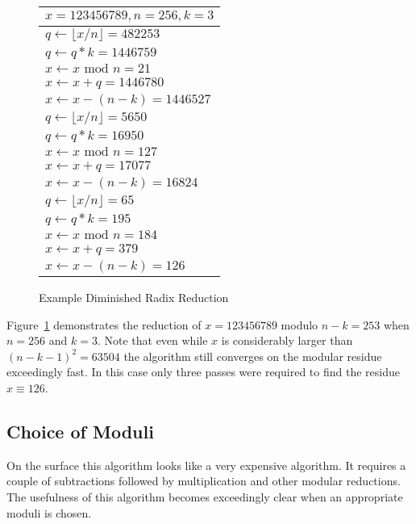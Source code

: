 \documentclass[b5paper]{book}
\begin{document}
\begin{figure}
\begin{small}
\begin{center}
\begin{tabular}{|l|}
\hline
$x = 123456789, n = 256, k = 3$ \\
\hline $q \leftarrow \lfloor x/n \rfloor = 482253$ \\
$q \leftarrow q*k = 1446759$ \\
$x \leftarrow x \mbox{ mod } n = 21$ \\
$x \leftarrow x + q = 1446780$ \\
$x \leftarrow x - (n - k) = 1446527$ \\
\hline 
$q \leftarrow \lfloor x/n \rfloor = 5650$ \\
$q \leftarrow q*k = 16950$ \\
$x \leftarrow x \mbox{ mod } n = 127$ \\
$x \leftarrow x + q = 17077$ \\
$x \leftarrow x - (n - k) = 16824$ \\
\hline 
$q \leftarrow \lfloor x/n \rfloor = 65$ \\
$q \leftarrow q*k = 195$ \\
$x \leftarrow x \mbox{ mod } n = 184$ \\
$x \leftarrow x + q = 379$ \\
$x \leftarrow x - (n - k) = 126$ \\
\hline
\end{tabular}
\end{center}
\end{small}
\caption{Example Diminished Radix Reduction}
\label{fig:EXDR}
\end{figure}

Figure~\ref{fig:EXDR} demonstrates the reduction of $x = 123456789$ modulo $n - k = 253$ when $n = 256$ and $k = 3$.  Note that even while $x$
is considerably larger than $(n - k - 1)^2 = 63504$ the algorithm still converges on the modular residue exceedingly fast.  In this case only
three passes were required to find the residue $x \equiv 126$.


\subsection{Choice of Moduli}
On the surface this algorithm looks like a very expensive algorithm.  It requires a couple of subtractions followed by multiplication and other
modular reductions.  The usefulness of this algorithm becomes exceedingly clear when an appropriate moduli is chosen.
\end{document}
